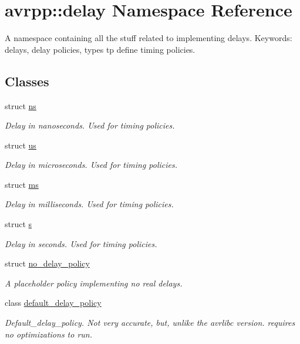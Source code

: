\hypertarget{namespaceavrpp_1_1delay}{
\section{avrpp::delay Namespace Reference}
\label{namespaceavrpp_1_1delay}
}


A namespace containing all the stuff related to implementing delays. Keywords: delays, delay policies, types tp define timing policies.  


\subsection*{Classes}
\begin{DoxyCompactItemize}
\item 
struct \hyperlink{structavrpp_1_1delay_1_1ns}{ns}
\begin{DoxyCompactList}\small\item\em Delay in nanoseconds. Used for timing policies. \item\end{DoxyCompactList}\item 
struct \hyperlink{structavrpp_1_1delay_1_1us}{us}
\begin{DoxyCompactList}\small\item\em Delay in microseconds. Used for timing policies. \item\end{DoxyCompactList}\item 
struct \hyperlink{structavrpp_1_1delay_1_1ms}{ms}
\begin{DoxyCompactList}\small\item\em Delay in milliseconds. Used for timing policies. \item\end{DoxyCompactList}\item 
struct \hyperlink{structavrpp_1_1delay_1_1s}{s}
\begin{DoxyCompactList}\small\item\em Delay in seconds. Used for timing policies. \item\end{DoxyCompactList}\item 
struct \hyperlink{structavrpp_1_1delay_1_1no__delay__policy}{no\_\-delay\_\-policy}
\begin{DoxyCompactList}\small\item\em A placeholder policy implementing no real delays. \item\end{DoxyCompactList}\item 
class \hyperlink{classavrpp_1_1delay_1_1default__delay__policy}{default\_\-delay\_\-policy}
\begin{DoxyCompactList}\small\item\em Default\_\-delay\_\-policy. Not very accurate, but, unlike the avrlibc version. requires no optimizations to run. \item\end{DoxyCompactList}\end{DoxyCompactItemize}
